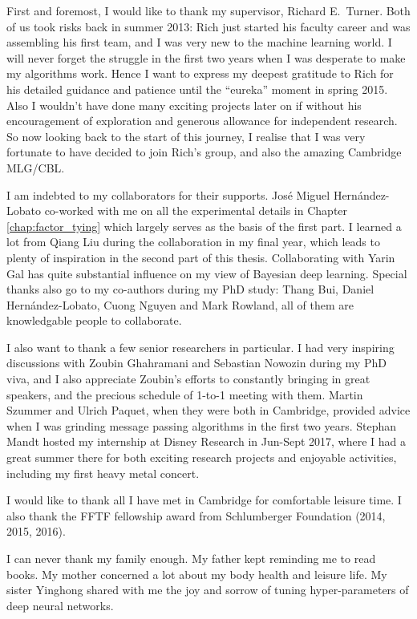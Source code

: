 
\begin{acknowledgements}      

First and foremost, I would like to thank my supervisor, Richard E.~Turner. Both of us took risks back in summer 2013: Rich just started his faculty career and was assembling his first team, and I was very new to the machine learning world. I will never forget the struggle in the first two years when I was desperate to make my algorithms work. Hence I want to express my deepest gratitude to Rich for his detailed guidance and patience until the ``eureka'' moment in spring 2015. Also I wouldn't have done many exciting projects later on if without his encouragement of exploration and generous allowance for independent research. So now looking back to the start of this journey, I realise that I was very fortunate to have decided to join Rich's group, and also the amazing Cambridge MLG/CBL.

I am indebted to my collaborators for their supports. Jos{\'e} Miguel Hern{\'a}ndez-Lobato co-worked with me on all the experimental details in Chapter \ref{chap:factor_tying} which largely serves as the basis of the first part. I learned a lot from Qiang Liu during the collaboration in my final year, which leads to plenty of inspiration in the second part of this thesis. Collaborating with Yarin Gal has quite substantial influence on my view of Bayesian deep learning. Special thanks also go to my co-authors during my PhD study: Thang Bui, Daniel Hern{\'a}ndez-Lobato, Cuong Nguyen and Mark Rowland, all of them are knowledgable people to collaborate. 

I also want to thank a few senior researchers in particular. I had very inspiring discussions with Zoubin Ghahramani and Sebastian Nowozin during my PhD viva, and I also appreciate Zoubin's efforts to constantly bringing in great speakers, and the precious schedule of 1-to-1 meeting with them. Martin Szummer and Ulrich Paquet, when they were both in Cambridge, provided advice when I was grinding message passing algorithms in the first two years. Stephan Mandt hosted my internship at Disney Research in Jun-Sept 2017, where I had a great summer there for both exciting research projects and enjoyable activities, including my first heavy metal concert.

%
I would like to thank all I have met in Cambridge for comfortable leisure time. I also thank the FFTF fellowship award from Schlumberger Foundation (2014, 2015, 2016). 

I can never thank my family enough. My father kept reminding me to read books. My mother concerned a lot about my body health and leisure life. My sister Yinghong shared with me the joy and sorrow of tuning hyper-parameters of deep neural networks.

\end{acknowledgements}
